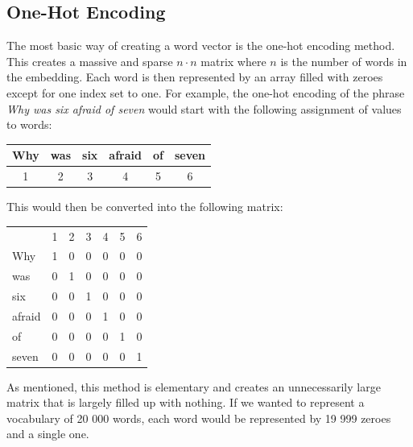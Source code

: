 \documentclass[nofilelist]{cslthse-msc}
\begin{document}

\subsection{One-Hot Encoding}
The most basic way of creating a word vector is the one-hot encoding method. This creates a massive and sparse $n \cdot n$ matrix where $n$ is the number of words in the embedding. Each word is then represented by an array filled with zeroes except for one index set to one. For example, the one-hot encoding of the phrase \textit{Why was six afraid of seven} would start with the following assignment of values to words:

\begin{center}
    \begin{tabular}{c|c|c|c|c|c}
    
         Why & was & six & afraid & of & seven \\
         \hline
         1 & 2 & 3 & 4 & 5 & 6 \\
    \end{tabular}
\end{center}

This would then be converted into the following matrix:

\begin{center}
    \begin{tabular}{lllllll}
                            & 1 & 2 & 3 & 4 & 5 & 6 \\ \cline{2-7} 
\multicolumn{1}{l|}{Why}    & 1 & 0 & 0 & 0 & 0 & 0 \\
\multicolumn{1}{l|}{was}    & 0 & 1 & 0 & 0 & 0 & 0 \\
\multicolumn{1}{l|}{six}    & 0 & 0 & 1 & 0 & 0 & 0 \\
\multicolumn{1}{l|}{afraid} & 0 & 0 & 0 & 1 & 0 & 0 \\
\multicolumn{1}{l|}{of}     & 0 & 0 & 0 & 0 & 1 & 0 \\
\multicolumn{1}{l|}{seven}  & 0 & 0 & 0 & 0 & 0 & 1
    \end{tabular}
\end{center}

As mentioned, this method is elementary and creates an unnecessarily large matrix that is largely filled up with nothing. If we wanted to represent a vocabulary of 20 000 words, each word would be represented by 19 999 zeroes and a single one. 
\end{document}
